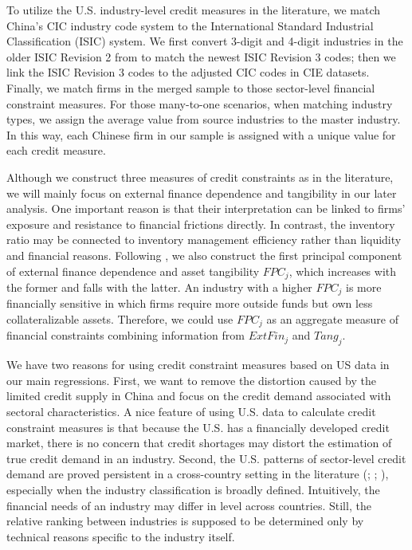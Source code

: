 \documentclass[12pt]{article}
\begin{document}
To utilize the U.S. industry-level credit measures in the literature, we match China's CIC industry code system to the International Standard Industrial Classification (ISIC) system. We first convert 3-digit and 4-digit industries in the older ISIC Revision 2 from \cite{manova-wei-zhang2015} to match the newest ISIC Revision 3 codes; then we link the ISIC Revision 3 codes to the adjusted CIC codes in CIE datasets. Finally, we match firms in the merged sample to those sector-level financial constraint measures. For those many-to-one scenarios, when matching industry types, we assign the average value from source industries to the master industry. In this way, each Chinese firm in our sample is assigned with a unique value for each credit measure.

Although we construct three measures of credit constraints as in the literature, we will mainly focus on external finance dependence and tangibility in our later analysis. One important reason is that their interpretation can be linked to firms' exposure and resistance to financial frictions directly. In contrast, the inventory ratio may be connected to inventory management efficiency rather than liquidity and financial reasons. Following \cite{manova-wei-zhang2015}, we also construct the first principal component of external finance dependence and asset tangibility $FPC_j$, which increases with the former and falls with the latter. An industry with a higher $FPC_j$ is more financially sensitive in which firms require more outside funds but own less collateralizable assets. Therefore, we could use $FPC_j$ as an aggregate measure of financial constraints combining information from $ExtFin_j$ and $Tang_j$.

We have two reasons for using credit constraint measures based on US data in our main regressions. First, we want to remove the distortion caused by the limited credit supply in China and focus on the credit demand associated with sectoral characteristics. A nice feature of using U.S. data to calculate credit constraint measures is that because the U.S. has a financially developed credit market, there is no concern that credit shortages may distort the estimation of true credit demand in an industry. Second, the U.S. patterns of sector-level credit demand are proved persistent in a cross-country setting in the literature (\cite{kroszner2007}; \cite{manova-wei-zhang2015}; \cite{fan-lai-li2015}), especially when the industry classification is broadly defined. Intuitively, the financial needs of an industry may differ in level across countries. Still, the relative ranking between industries is supposed to be determined only by technical reasons specific to the industry itself.
\end{document}
